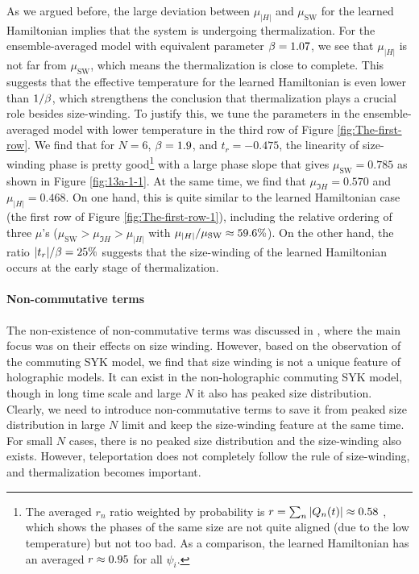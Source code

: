 \documentclass[11pt]{article}
\renewcommand{\>}{\rangle}
\newcommand{\<}{\langle}
\begin{document}
As we argued before, the large deviation between $\mu_{|H|}$ and
$\mu_{\text{SW}}$ for the learned Hamiltonian implies that the system
is undergoing thermalization. For the ensemble-averaged model with
equivalent parameter $\beta=1.07$, we see that $\mu_{|H|}$ is not far
from $\mu_{\text{SW}}$, which means the thermalization is close to
complete. This suggests that the effective temperature for the learned
Hamiltonian is even lower than $1/\beta$, which strengthens the conclusion
that thermalization plays a crucial role besides size-winding.
To justify this, we tune the parameters in the ensemble-averaged model
with lower temperature in the third row of Figure \ref{fig:The-first-row}.
We find that for $N=6$, $\beta=1.9$, and $t_{r}=-0.475$, the linearity of size-winding
phase is pretty good\footnote{The averaged $r_n$ ratio weighted by probability is $r=\sum_n |Q_n(t)|\approx 0.58$ \cite{Kobrin:2023rzr}, which shows the phases of the same size are not quite aligned (due to the low temperature) but not too bad. As a comparison, the learned Hamiltonian has an averaged $r\approx 0.95$ for all $\psi_i$.} with a large phase slope that gives $\mu_{\text{SW}}=0.785$
as shown in Figure \ref{fig:13a-1-1}. At the same time, we find that
$\mu_{\Im H}=0.570$ and $\mu_{|H|}=0.468$. On one hand, this is
quite similar to the learned Hamiltonian case (the first row of Figure
\ref{fig:The-first-row-1}), including the relative ordering of three
$\mu$'s ($\mu_{\text{SW}}>\mu_{\Im H}>\mu_{|H|}$ with $\mu_{|H|}/\mu_{\text{SW}}\approx59.6\%$).
On the other hand, the ratio $|t_{r}|/\beta=25\%$ suggests that the
size-winding of the learned Hamiltonian occurs at the early stage of
thermalization.



\paragraph{Non-commutative terms}

The non-existence of non-commutative terms was discussed in \cite{Kobrin:2023rzr,Jafferis:2023moh},
where the main focus was on their effects on size winding. However,
based on the observation of the commuting SYK model, we find that
size winding is not a unique feature of holographic models. It can
exist in the non-holographic commuting SYK model, though in long time
scale and large $N$ it also has peaked size distribution. Clearly,
we need to introduce non-commutative terms to save it from peaked
size distribution in large $N$ limit and keep the size-winding feature
at the same time. For small $N$ cases, there is no peaked size distribution
and the size-winding also exists. However, teleportation does
not completely follow the rule of size-winding, and thermalization
becomes important.
\end{document}
